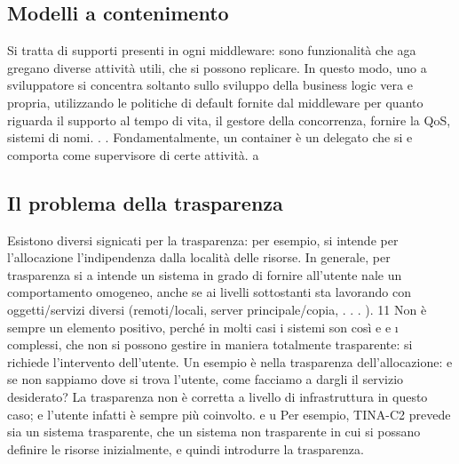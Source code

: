 \documentclass[a4paper,12pt]{article}
\begin{document}
\subsection{Modelli a contenimento}
Si tratta di supporti presenti in ogni middleware: sono funzionalità che aga
gregano diverse attività utili, che si possono replicare. In questo modo, uno
a
sviluppatore si concentra soltanto sullo sviluppo della business logic vera e
propria, utilizzando le politiche di default fornite dal middleware per quanto
riguarda il supporto al tempo di vita, il gestore della concorrenza, fornire la
QoS, sistemi di nomi. . . Fondamentalmente, un container è un delegato che si
e
comporta come supervisore di certe attività.
a
\subsection{Il problema della trasparenza}
Esistono diversi signicati per la trasparenza: per esempio, si intende per l'allocazione l'indipendenza dalla località
delle risorse. In generale, per trasparenza si
a
intende un sistema in grado di fornire all'utente nale un comportamento omogeneo, anche se ai livelli sottostanti sta
lavorando con oggetti/servizi diversi
(remoti/locali, server principale/copia, . . . ).
11
Non è sempre un elemento positivo, perché in molti casi i sistemi son così
e
e
\i{}
complessi, che non si possono gestire in maniera totalmente trasparente: si
richiede l'intervento dell'utente. Un esempio è nella trasparenza dell'allocazione:
e
se non sappiamo dove si trova l'utente, come facciamo a dargli il servizio desiderato? La trasparenza non è corretta a
livello di infrastruttura in questo caso;
e
l'utente infatti è sempre più coinvolto.
e
u
Per esempio, TINA-C2 prevede sia un sistema trasparente, che un sistema
non trasparente in cui si possano definire le risorse inizialmente, e quindi introdurre la trasparenza.
\end{document}
